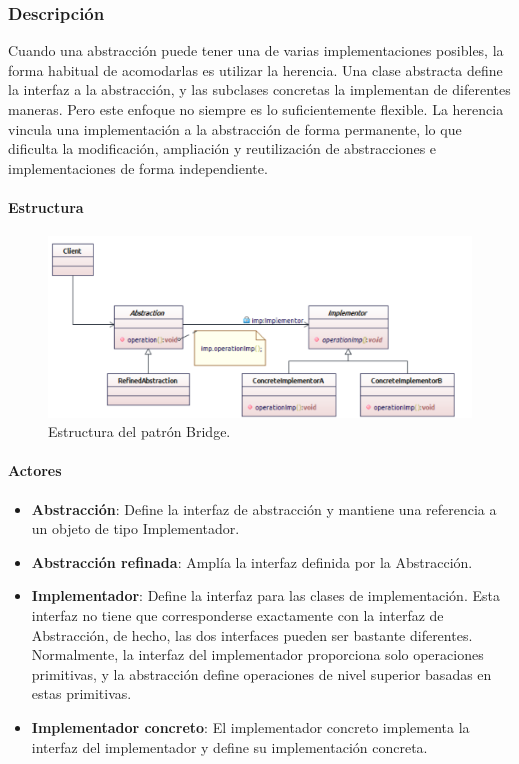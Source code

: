 \subsubsection{Descripción}
Cuando una abstracción puede tener una de varias implementaciones posibles, la forma habitual de acomodarlas es utilizar la herencia. Una clase abstracta define la interfaz a la abstracción, y las subclases concretas la implementan de diferentes maneras. Pero este enfoque no siempre es lo suficientemente flexible. La herencia vincula una implementación a la abstracción de forma permanente, lo que dificulta la modificación, ampliación y reutilización de abstracciones e implementaciones de forma independiente.

\paragraph{Estructura}

\begin{figure}[th!]
	\centering
	\includegraphics[width=.7\linewidth]{imagenes/Patrones/Bridge.pdf}
	\caption{Estructura del patrón Bridge.\cite{gof}}	
\end{figure}

\paragraph{Actores}


\begin{itemize}
	\item \textbf{Abstracción}: Define la interfaz de abstracción y mantiene una referencia a un objeto de tipo Implementador.
	\item \textbf{Abstracción refinada}: Amplía la interfaz definida por la Abstracción.
	\item \textbf{Implementador}: Define la interfaz para las clases de implementación. Esta interfaz no tiene que corresponderse exactamente con la interfaz de Abstracción, de hecho, las dos interfaces pueden ser bastante diferentes. Normalmente, la interfaz del implementador proporciona solo operaciones primitivas, y la abstracción define operaciones de nivel superior basadas en estas primitivas.
	\item \textbf{Implementador concreto}: El implementador concreto implementa la interfaz del implementador y define su implementación concreta.
\end{itemize}


